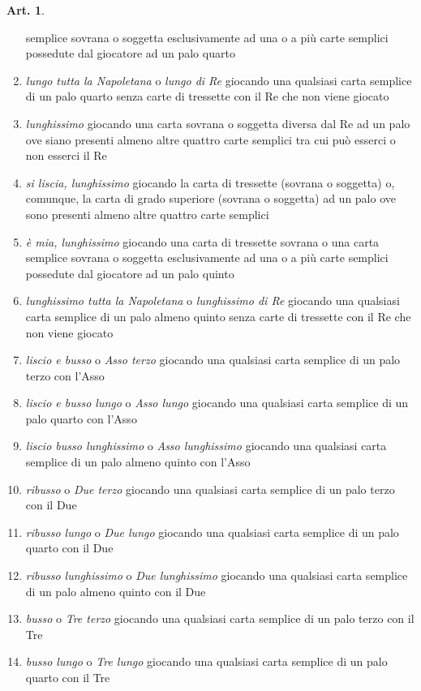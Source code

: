 \documentclass[italian,a4paper]{article}
\theoremstyle{definition}
\newtheorem{art}{Art.}
\begin{document}
\begin{art}
\begin{enumerate}
semplice sovrana o soggetta esclusivamente ad una o a più carte semplici
possedute dal giocatore ad un palo quarto 
\item      \emph{lungo tutta la Napoletana} o \emph{lungo di Re} giocando una qualsiasi
carta semplice di un palo quarto senza carte di tressette con il Re che non
viene giocato
\item      \emph{lunghissimo} giocando una carta sovrana o soggetta diversa dal Re
ad un palo ove siano presenti almeno altre quattro carte semplici tra cui
può esserci o non esserci il Re
\item      \emph{si liscia, lunghissimo} giocando la carta di tressette (sovrana o
soggetta) o, comunque, la carta di grado superiore (sovrana o soggetta) ad
un palo ove sono  presenti almeno altre quattro carte semplici
\item      \emph{è mia, lunghissimo} giocando una carta di tressette sovrana o una
carta semplice sovrana o soggetta esclusivamente ad una o a più carte
semplici possedute dal giocatore ad un palo quinto
\item      \emph{lunghissimo tutta la Napoletana} o \emph{lunghissimo di Re} giocando una
qualsiasi carta semplice di un palo almeno quinto senza carte di tressette
con il Re che non viene giocato
\item      \emph{liscio e busso} o \emph{Asso terzo} giocando una qualsiasi carta semplice
di un palo terzo con l’Asso
\item      \emph{liscio e busso lungo} o \emph{Asso lungo} giocando una qualsiasi carta
semplice di un palo quarto con l’Asso
\item      \emph{liscio  busso lunghissimo} o \emph{Asso lunghissimo} giocando una
qualsiasi carta semplice di un palo almeno quinto con l’Asso
\item      \emph{ribusso} o \emph{Due terzo} giocando una qualsiasi carta semplice di un
palo terzo con il Due
\item      \emph{ribusso lungo} o \emph{Due lungo} giocando una qualsiasi carta semplice
di un palo quarto con il Due
\item      \emph{ribusso lunghissimo} o \emph{Due lunghissimo} giocando una qualsiasi
carta semplice di un palo almeno quinto con il Due
\item      \emph{busso} o \emph{Tre terzo} giocando una qualsiasi carta semplice di un
palo terzo con il Tre
\item      \emph{busso lungo} o \emph{Tre lungo} giocando una qualsiasi carta semplice di
un palo quarto con il Tre

\end{enumerate}
\end{art}
\end{document}
